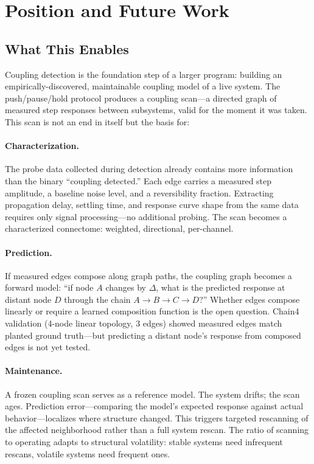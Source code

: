 \section{Position and Future Work}
\label{sec:position}

\subsection{What This Enables}

Coupling detection is the foundation step of a larger program: building
an empirically-discovered, maintainable coupling model of a live system.
The push/pause/hold protocol produces a coupling scan---a directed graph
of measured step responses between subsystems, valid for the moment it
was taken. This scan is not an end in itself but the basis for:

\paragraph{Characterization.}
The probe data collected during detection already contains more
information than the binary ``coupling detected.'' Each edge carries a
measured step amplitude, a baseline noise level, and a reversibility
fraction. Extracting propagation delay, settling time, and response
curve shape from the same data requires only signal processing---no
additional probing. The scan becomes a characterized connectome:
weighted, directional, per-channel.

\paragraph{Prediction.}
If measured edges compose along graph paths, the coupling graph
becomes a forward model: ``if node $A$ changes by $\Delta$, what is
the predicted response at distant node $D$ through the chain $A \to B
\to C \to D$?'' Whether edges compose linearly or require a learned
composition function is the open question. Chain4 validation (4-node
linear topology, 3 edges) showed measured edges match planted ground
truth---but predicting a distant node's response from composed edges
is not yet tested.

\paragraph{Maintenance.}
A frozen coupling scan serves as a reference model. The system drifts;
the scan ages. Prediction error---comparing the model's expected
response against actual behavior---localizes where structure changed.
This triggers targeted rescanning of the affected neighborhood rather
than a full system rescan. The ratio of scanning to operating adapts
to structural volatility: stable systems need infrequent rescans,
volatile systems need frequent ones.

